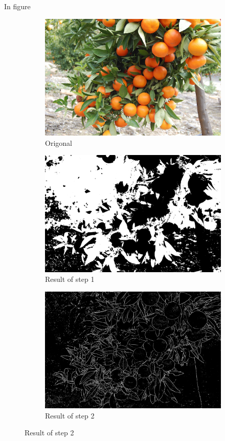 \documentclass[conference]{IEEEtran}
\begin{document}
In figure 


\begin{figure}[H]
  \begin{subfigure}{.3\linewidth}
 	 \includegraphics[width=\linewidth]{citrus1/citrus1_orig.jpg}\hfill
	 \caption{Origonal}
  \end{subfigure}
  \begin{subfigure}{.3\linewidth}
  	\includegraphics[width=\linewidth]{citrus1/citrus1_NDI.jpg}\hfill
   	\caption{Result of step 1}
  \end{subfigure}
  \begin{subfigure}{.3\linewidth}
  	\includegraphics[width=\linewidth]{citrus1/citrus1_mean.jpg}
  	\caption{Result of step 2}
  \end{subfigure}\par\medskip
  

\end{figure}
\end{document}
